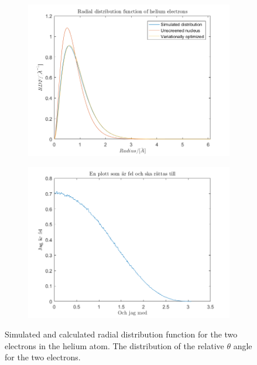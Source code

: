 \begin{figure}[H]
    \centering
    \captionsetup[subfigure]{justification=centering}
    \begin{subfigure}[b]{0.40\textwidth}
        \centering
        \includegraphics[width=\textwidth]{graphics/task1/radius.png}
    \end{subfigure}
    \begin{subfigure}[b]{0.40\textwidth}
        \centering
        \includegraphics[width=\textwidth]{graphics/task1/angle_diff_dist.png}
    \end{subfigure}
    \caption{Simulated and calculated radial distribution function for the two electrons in the helium atom. The distribution of the relative $\theta$ angle for the two electrons.}
    \label{fig:RDF}
\end{figure}

